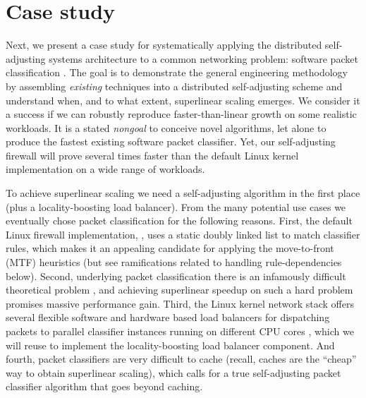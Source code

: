 \section{Case study }\label{sec:case-study}

Next, we present a case study for systematically applying the distributed self-adjusting systems architecture to a common networking problem: software packet classification \cite{gupta2001algorithms}. The goal is to demonstrate the general engineering methodology by assembling \emph{existing} techniques into a distributed self-adjusting scheme and understand when, and to what extent, superlinear scaling emerges. We consider it a success if we can robustly reproduce faster-than-linear growth on some realistic workloads. It is a stated \emph{nongoal} to conceive novel algorithms, let alone to produce the fastest existing software packet classifier. %
Yet, our self-adjusting firewall will prove several times faster than the default Linux kernel implementation on a wide range of workloads.

To achieve superlinear scaling we need a self-adjusting algorithm in the first place (plus a locality-boosting load balancer). From the many potential use cases %
\cite{SleatorT85Splay, BentleyCL93, HesterH85, HesterH85, BentleySTW86, Avin0020, ParkM12} we eventually chose packet classification for the following reasons.  First, the default Linux firewall implementation, \nftables, uses a static doubly linked list to match classifier rules, which makes it an appealing candidate for applying the move-to-front (MTF) heuristics (but see ramifications related to handling rule-dependencies below). %
Second, underlying packet classification there is an infamously difficult theoretical problem \cite{10.1145/2619239.2626294,10.1006/jagm.1996.0063, PacutVAPRS2022, 10.1145/2619239.2626294, 10.1145/1851182.1851208, 10.1145/863955.863980, gupta2001algorithms, 10.1145/3359989.3365431}, and achieving superlinear speedup on such a hard problem promises massive performance gain. Third, the Linux kernel network stack offers several flexible software and hardware based load balancers for dispatching packets to parallel classifier instances running on different CPU cores \cite{rss-linux}, which we will reuse to implement the locality-boosting load balancer component. And fourth, packet classifiers are very difficult to cache \cite{1354643} (recall, caches are the ``cheap'' way to obtain superlinear scaling), which calls for a true self-adjusting packet classifier algorithm that goes beyond caching. %

